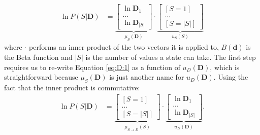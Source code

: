 \documentclass[twoside,11pt]{article}
\begin{document}
\begin{align}\label{eq:D:1}
\ln P(S|\bm{D}) &= \underbrace{\begin{bmatrix}
\ln \bm{D}_1\\
...\\
\ln \bm{D}_{|S|}
\end{bmatrix}}_{\mu_{S}(\bm{D})}
\cdot
\underbrace{\begin{bmatrix}
[S = 1]\\
...\\
[S = |S|]
\end{bmatrix}}_{u_{S}(S)}
\end{align}
where $\cdot$ performs an inner product of the two vectors it is applied to, $B(\bm{d})$ is the Beta function and $|S|$ is the number of values a state can take. The first step requires us to re-write Equation \ref{eq:D:1} as a function of $u_{D}(\bm{D})$, which is straightforward because $\mu_{S}(\bm{D})$ is just another name for $u_{D}(\bm{D})$. Using the fact that the inner product is commutative:
\begin{align}\label{eq:D:2}
\ln P(S|\bm{D}) &= \underbrace{\begin{bmatrix}
[S = 1]\\
...\\
[S = |S|]
\end{bmatrix}}_{\mu_{S\rightarrow D}(S)}
\cdot
\underbrace{\begin{bmatrix}
\ln \bm{D}_1\\
...\\
\ln \bm{D}_{|S|}
\end{bmatrix}}_{u_{D}(\bm{D})}.
\end{align}
\end{document}
